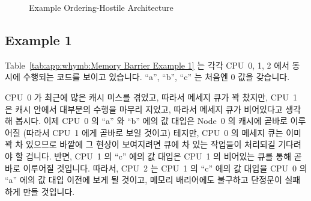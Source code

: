 \begin{figure}[htb]
\centering
{}
\caption{Example Ordering-Hostile Architecture}
\label{fig:app:whymb:Example Ordering-Hostile Architecture}
\end{figure}

\subsection{Example 1}
\label{sec:app:whymb:Example 1}

Table~\ref{tab:app:whymb:Memory Barrier Example 1} 는 각각 CPU~0, 1, 2 에서
동시에 수행되는 코드를 보이고 있습니다.
``a'', ``b'', ``c'' 는 처음엔 0 값을 갖습니다.

\begin{table}
\small
{}
\caption{Memory Barrier Example 1}
\label{tab:app:whymb:Memory Barrier Example 1}
\end{table}

CPU~0 가 최근에 많은 캐시 미스를 겪었고, 따라서 메세지 큐가 꽉 찼지만, CPU~1 은
캐시 안에서 대부분의 수행을 마무리 지었고, 따라서 메세지 큐가 비어있다고 생각해
봅시다.
이제 CPU~0 의 ``a'' 와 ``b'' 에의 값 대입은 Node~0 의 캐시에 곧바로 이루어질
(따라서 CPU~1 에게 곧바로 보일 것이고) 테지만, CPU~0 의 메세지 큐는 이미 꽉 차
있으므로 바깥에 그 현상이 보여지려면 큐에 차 있는 작업들이 처리되길 기다려야 할
겁니다.
반면, CPU~1 의 ``c'' 에의 값 대입은 CPU~1 의 비어있는 큐를 통해 곧바로 이루어질
것입니다.
따라서, CPU~2 는 CPU~1 의 ``c'' 에의 값 대입을 CPU~0 의 ``a'' 에의 값 대입
이전에 보게 될 것이고, 메모리 배리어에도 불구하고 단정문이 실패하게 만들
것입니다.

